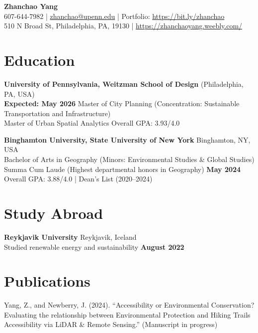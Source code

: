 \documentclass[11pt]{article}
\begin{document}
\begin{center}
    {\LARGE \bf Zhanchao Yang} \\[2mm]
    607-644-7982 \quad | \quad \href{mailto:zhanchao@upenn.edu}{zhanchao@upenn.edu} \quad | \quad Portfolio: \href{https://bit.ly/zhanchao}{https://bit.ly/zhanchao} \\[1mm]
    510 N Broad St, Philadelphia, PA, 19130 \quad | \quad \href{https://zhanchaoyang.weebly.com/}{https://zhanchaoyang.weebly.com/}
\end{center}

\vspace{4mm}

\section*{Education}
\noindent
\textbf{University of Pennsylvania, Weitzman School of Design} (Philadelphia, PA, USA) \\\hfill \textbf{Expected: May 2026}
Master of City Planning \quad (Concentration: Sustainable Transportation and Infrastructure) \\
Master of Urban Spatial Analytics 
Overall GPA: 3.93/4.0

\vspace{2mm}
\noindent
\textbf{Binghamton University, State University of New York} \hfill Binghamton, NY, USA \\
Bachelor of Arts in Geography \quad (Minors: Environmental Studies \& Global Studies) \\
Summa Cum Laude \quad (Highest departmental honors in Geography) \hfill \textbf{May 2024} \\
Overall GPA: 3.88/4.0 \quad | \quad Dean's List (2020--2024)

\section*{Study Abroad}
\noindent
\textbf{Reykjavik University} \hfill Reykjavik, Iceland \\
Studied renewable energy and sustainability \hfill \textbf{August 2022}

\section*{Publications}
\noindent
Yang, Z., and Newberry, J. (2024). ``Accessibility or Environmental Conservation? Evaluating the relationship between Environmental Protection and Hiking Trails Accessibility via LiDAR \& Remote Sensing.'' (Manuscript in progress)
\end{document}
